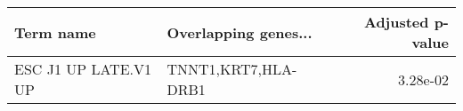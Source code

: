 \begin{tabular}{llr}
\toprule
           Term name & Overlapping genes... &  Adjusted p-value \\
\midrule
ESC J1 UP LATE.V1 UP &  TNNT1,KRT7,HLA-DRB1 &          3.28e-02 \\
\bottomrule
\end{tabular}

